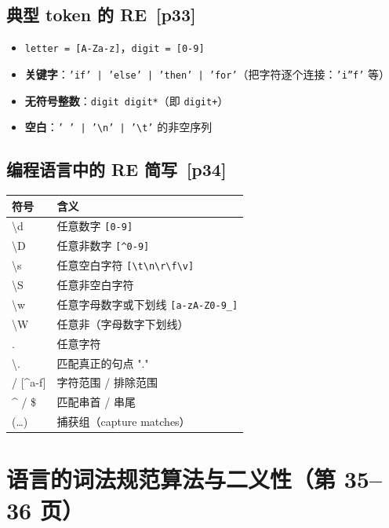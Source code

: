 \documentclass[UTF8,fontset=none,11pt]{ctexart}
\newcommand{\pg}[1]{{\small\color{gray}\,[p#1]}}
\begin{document}
\subsection{典型 token 的 RE \pg{33}}
\begin{itemize}
  \item \texttt{letter = [A-Za-z]}，\quad \texttt{digit = [0-9]}
  \item \textbf{关键字}：\texttt{'if' | 'else' | 'then' | 'for'}（把字符逐个连接：\texttt{'i''f'} 等）
  \item \textbf{无符号整数}：\texttt{digit digit*}（即 \texttt{digit+}）
  \item \textbf{空白}：\texttt{' ' | '\textbackslash n' | '\textbackslash t'} 的非空序列
\end{itemize}

\subsection{编程语言中的 RE 简写 \pg{34}}
\begin{longtable}{>{\ttfamily}l p{10cm}}
\toprule
\normalfont\textbf{符号} & \textbf{含义} \\
\midrule
\textbackslash d & 任意数字 \texttt{[0-9]} \\
\textbackslash D & 任意非数字 \texttt{[\^{}0-9]} \\
\textbackslash s & 任意空白字符 \texttt{[\textbackslash t\textbackslash n\textbackslash r\textbackslash f\textbackslash v]} \\
\textbackslash S & 任意非空白字符 \\
\textbackslash w & 任意字母数字或下划线 \texttt{[a-zA-Z0-9\_]} \\
\textbackslash W & 任意非（字母数字下划线） \\
. & 任意字符 \\
\textbackslash. & 匹配真正的句点 "." \\
{[a-f]} / {[\^{}a-f]} & 字符范围 / 排除范围 \\
\^{} / \$ & 匹配串首 / 串尾 \\
(\dots) & 捕获组（capture matches）\\
\bottomrule
\end{longtable}

\section{语言的词法规范算法与二义性（第 35--36 页）}
\end{document}
